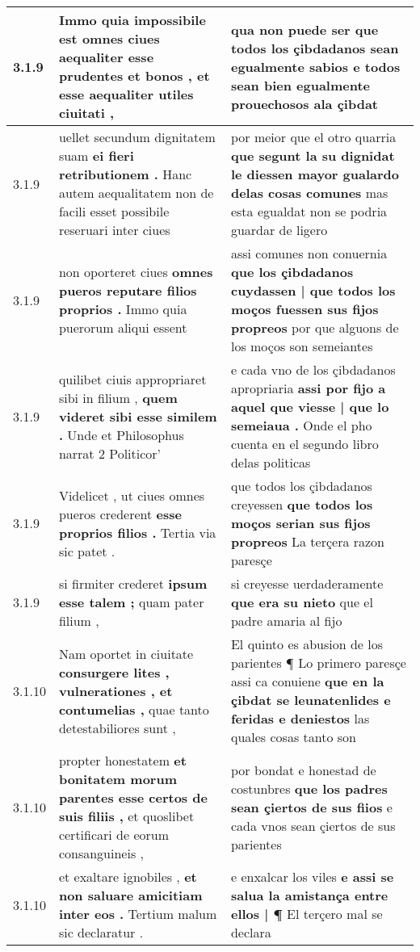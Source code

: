 \begin{tabular}{|p{1cm}|p{6.5cm}|p{6.5cm}|}
3.1.9 & Immo quia impossibile est omnes ciues \textbf{ aequaliter esse prudentes et bonos , } et esse aequaliter utiles ciuitati , & qua non puede ser \textbf{ que todos los çibdadanos sean egualmente sabios } e todos sean bien egualmente prouechosos ala çibdat \\\hline
3.1.9 & uellet secundum dignitatem suam \textbf{ ei fieri retributionem . } Hanc autem aequalitatem non de facili esset possibile reseruari inter ciues & por meior que el otro quarria \textbf{ que segunt la su dignỉdat le diessen mayor gualardo delas cosas comunes } mas esta egualdat non se podria guardar de ligero \\\hline
3.1.9 & non oporteret ciues \textbf{ omnes pueros reputare filios proprios . } Immo quia puerorum aliqui essent & assi comunes non conuernia \textbf{ que los çibdadanos cuydassen | que todos los moços fuessen sus fijos propreos } por que alguons de los moços son semeiantes \\\hline
3.1.9 & quilibet ciuis appropriaret sibi in filium , \textbf{ quem videret sibi esse similem . } Unde et Philosophus narrat 2 Politicor’ & e cada vno de los çibdadanos apropriaria \textbf{ assi por fijo a aquel que viesse | que lo semeiaua . } Onde el pho cuenta en el segundo libro delas politicas \\\hline
3.1.9 & Videlicet , ut ciues omnes pueros crederent \textbf{ esse proprios filios . } Tertia via sic patet . & que todos los çibdadanos creyessen \textbf{ que todos los moços serian sus fijos propreos } La terçera razon paresçe \\\hline
3.1.9 & si firmiter crederet \textbf{ ipsum esse talem ; } quam pater filium , & si creyesse uerdaderamente \textbf{ que era su nieto } que el padre amaria al fijo \\\hline
3.1.10 & Nam oportet in ciuitate \textbf{ consurgere lites , vulnerationes , et contumelias , } quae tanto detestabiliores sunt , & El quinto es abusion de los parientes ¶ Lo primero paresçe assi ca conuiene \textbf{ que en la çibdat se leunatenlides e feridas e deniestos } las quales cosas tanto son \\\hline
3.1.10 & propter honestatem \textbf{ et bonitatem morum parentes esse certos de suis filiis , } et quoslibet certificari de eorum consanguineis , & por bondat e honestad de costunbres \textbf{ que los padres sean çiertos de sus fiios } e cada vnos sean çiertos de sus parientes \\\hline
3.1.10 & et exaltare ignobiles , \textbf{ et non saluare amicitiam inter eos . } Tertium malum sic declaratur . & e enxalcar los viles \textbf{ e assi se salua la amistança entre ellos | ¶ } El terçero mal se declara \\\hline

\end{tabular}
